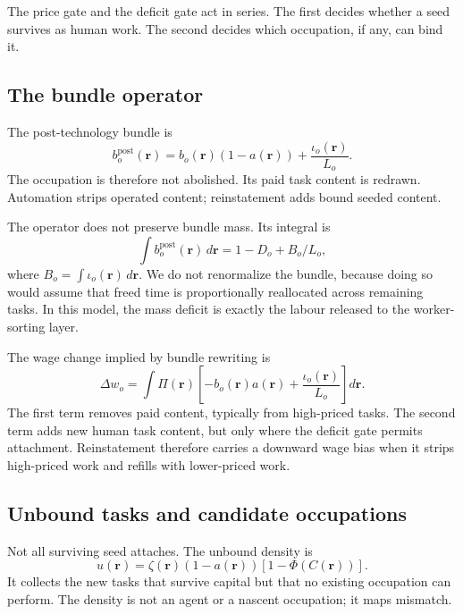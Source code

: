 \documentclass[12pt, a4paper]{article}
\begin{document}
The price gate and the deficit gate act in series. The first decides
whether a seed survives as human work. The second decides which
occupation, if any, can bind it.

\subsection{The bundle operator}
\label{sec:bundle-operator}

The post-technology bundle is
\begin{equation}
  b_o^{\text{post}}(\mathbf{r})
  =
  b_o(\mathbf{r})(1-a(\mathbf{r}))
  +
  \frac{\iota_o(\mathbf{r})}{L_o}.
  \label{eq:bundle-operator}
\end{equation}
The occupation is therefore not abolished. Its paid task content is
redrawn. Automation strips operated content; reinstatement adds bound
seeded content.

The operator does not preserve bundle mass. Its integral is
\[
  \int b_o^{\text{post}}(\mathbf{r})\,d\mathbf{r}
  =
  1 - D_o + B_o/L_o,
\]
where $B_o=\int\iota_o(\mathbf{r})\,d\mathbf{r}$. We do not renormalize
the bundle, because doing so would assume that freed time is
proportionally reallocated across remaining tasks. In this model, the
mass deficit is exactly the labour released to the worker-sorting
layer.

The wage change implied by bundle rewriting is
\begin{equation}
  \Delta w_o
  =
  \int
  \Pi(\mathbf{r})
  \left[
    -b_o(\mathbf{r})a(\mathbf{r})
    +
    \frac{\iota_o(\mathbf{r})}{L_o}
  \right]
  d\mathbf{r}.
  \label{eq:wage-change}
\end{equation}
The first term removes paid content, typically from high-priced tasks.
The second term adds new human task content, but only where the deficit
gate permits attachment. Reinstatement therefore carries a downward
wage bias when it strips high-priced work and refills with lower-priced
work.

\subsection{Unbound tasks and candidate occupations}
\label{sec:unbound}

Not all surviving seed attaches. The unbound density is
\begin{equation}
  u(\mathbf{r})
  =
  \zeta(\mathbf{r})
  (1-a(\mathbf{r}))
  [1-\Phi(C(\mathbf{r}))].
  \label{eq:unbound}
\end{equation}
It collects the new tasks that survive capital but that no existing
occupation can perform. The density is not an agent or a nascent
occupation; it maps mismatch.
\end{document}
